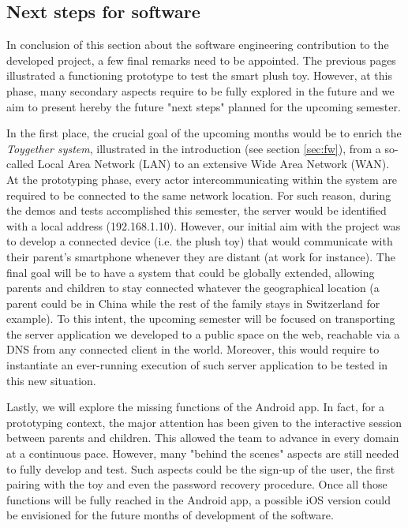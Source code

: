 \newpage
\subsection{Next steps for software}
\label{subsec:software_next} 

In conclusion of this section about the software engineering contribution to the developed project, a few final remarks need to be appointed. The previous pages illustrated a functioning prototype to test the smart plush toy. However, at this phase, many secondary aspects require to be fully explored in the future and we aim to present hereby the future "next steps" planned for the upcoming semester. 

\medskip
In the first place, the crucial goal of the upcoming months would be to enrich the \textit{Toygether system}, illustrated in the introduction (see section \ref{sec:fw}), from a so-called Local Area Network (LAN) to an extensive Wide Area Network (WAN). At the prototyping phase, every actor intercommunicating within the system are required to be connected to the same network location. For such reason, during the demos and tests accomplished this semester, the server would be identified with a local address (192.168.1.10). However, our initial aim with the project was to develop a connected device (i.e. the plush toy) that would communicate with their parent's smartphone whenever they are distant (at work for instance). The final goal will be to have a system that could be globally extended, allowing parents and children to stay connected whatever the geographical location (a parent could be in China while the rest of the family stays in Switzerland for example). To this intent, the upcoming semester will be focused on transporting the server application we developed to a public space on the web, reachable via a DNS from any connected client in the world. Moreover, this would require to instantiate an ever-running execution of such server application to be tested in this new situation.

\medskip
Lastly, we will explore the missing functions of the Android app. In fact, for a prototyping context, the major attention has been given to the interactive session between parents and children. This allowed the team to advance in every domain at a continuous pace. However, many "behind the scenes" aspects are still needed to fully develop and test. Such aspects could be the sign-up of the user, the first pairing with the toy and even the password recovery procedure. Once all those functions will be fully reached in the Android app, a possible iOS version could be envisioned for the future months of development of the software.

